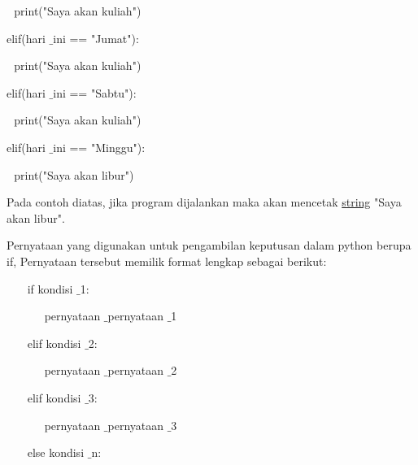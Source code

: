 \noindent 
\vspace{\baselineskip}
 $  $  $  $ print("Saya akan kuliah") \par
\noindent 
\vspace{\baselineskip}
elif(hari $  \_  $ini == "Jumat"): \par
\noindent 
\vspace{\baselineskip}
 $  $  $  $ print("Saya akan kuliah") \par
\noindent 
\vspace{\baselineskip}
elif(hari $  \_  $ini == "Sabtu"): \par
\noindent 
\vspace{\baselineskip}
 $  $  $  $ print("Saya akan kuliah") \par
\noindent 
\vspace{\baselineskip}
elif(hari $  \_  $ini == "Minggu"): \par
\noindent 
\vspace{\baselineskip}
 $  $  $  $ print("Saya akan libur") \par
\noindent 
\vspace{\baselineskip}
\vspace{\baselineskip}
Pada contoh diatas, jika program dijalankan maka akan mencetak $  $\href{https://www.belajarpython.com/2015/05/string-python.html}{string}
 $  $"Saya akan libur". \par
\noindent 
 $  $Pernyataan yang digunakan untuk pengambilan keputusan dalam python berupa if, Pernyataan tersebut memilik format lengkap sebagai berikut: \par
\vspace{12pt}
\noindent 
~~~ if kondisi $  \_  $1: \par
\vspace{12pt}
\noindent 
~~~~~~ pernyataan $  \_  $pernyataan $  \_  $1 \par
\vspace{12pt}
\noindent 
~~~ elif kondisi $  \_  $2: \par
\vspace{12pt}
\noindent 
~~~~~~ pernyataan $  \_  $pernyataan $  \_  $2 \par
\vspace{12pt}
\noindent 
~~~ elif kondisi $  \_  $3: \par
\vspace{12pt}
\noindent 
~~~~~~ pernyataan $  \_  $pernyataan $  \_  $3 \par
\vspace{12pt}
\noindent 
~~~ else kondisi $  \_  $n: \par

